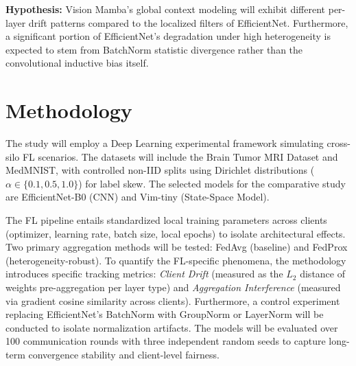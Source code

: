 \documentclass[conference]{IEEEtran}
\begin{document}
\textbf{Hypothesis:} Vision Mamba's global context modeling will exhibit different per-layer drift patterns compared to the localized filters of EfficientNet. Furthermore, a significant portion of EfficientNet's degradation under high heterogeneity is expected to stem from BatchNorm statistic divergence rather than the convolutional inductive bias itself.

\section{Methodology}
The study will employ a Deep Learning experimental framework simulating cross-silo FL scenarios. The datasets will include the Brain Tumor MRI Dataset and MedMNIST, with controlled non-IID splits using Dirichlet distributions ($\alpha \in \{0.1, 0.5, 1.0\}$) for label skew. The selected models for the comparative study are EfficientNet-B0 (CNN) and Vim-tiny (State-Space Model). 

The FL pipeline entails standardized local training parameters across clients (optimizer, learning rate, batch size, local epochs) to isolate architectural effects. Two primary aggregation methods will be tested: FedAvg (baseline) and FedProx (heterogeneity-robust). To quantify the FL-specific phenomena, the methodology introduces specific tracking metrics: \textit{Client Drift} (measured as the $L_2$ distance of weights pre-aggregation per layer type) and \textit{Aggregation Interference} (measured via gradient cosine similarity across clients). Furthermore, a control experiment replacing EfficientNet's BatchNorm with GroupNorm or LayerNorm will be conducted to isolate normalization artifacts. The models will be evaluated over 100 communication rounds with three independent random seeds to capture long-term convergence stability and client-level fairness.
\end{document}
